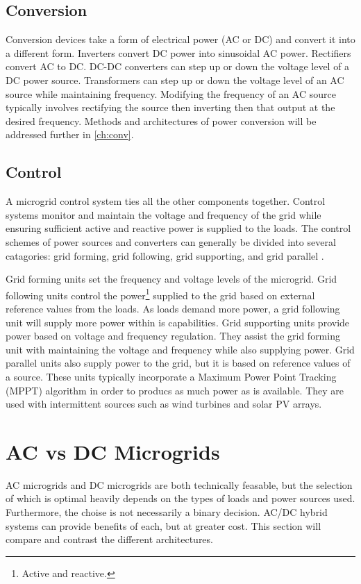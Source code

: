 \subsection{Conversion}
Conversion devices take a form of electrical power (AC or DC) and convert it into a different form. Inverters convert DC power into sinusoidal AC power. Rectifiers convert AC to DC. DC-DC converters can step up or down the voltage level of a DC power source. Transformers can step up or down the voltage level of an AC source while maintaining frequency. Modifying the frequency of an AC source typically involves rectifying the source then inverting then that output at the desired frequency. Methods and architectures of power conversion will be addressed further in \autoref{ch:conv}.

\subsection{Control}
A microgrid control system ties all the other components together. Control systems monitor and maintain the voltage and frequency of the grid while ensuring sufficient active and reactive power is supplied to the loads. The control schemes of power sources and converters can generally be divided into several catagories: grid forming, grid following, grid supporting, and grid parallel \cite{Ortjohann2012, Engler, Strauss2003}. 

Grid forming units set the frequency and voltage levels of the microgrid. Grid following units control the power\footnote{Active and reactive.} supplied to the grid based on external reference values from the loads. As loads demand more power, a grid following unit will supply more power within is capabilities. Grid supporting units provide power based on voltage and frequency regulation. They assist the grid forming unit with maintaining the voltage and frequency while also supplying power. Grid parallel units also supply power to the grid, but it is based on reference values of a source. These units typically incorporate a Maximum Power Point Tracking (MPPT) algorithm in order to producs as much power as is available. They are used with intermittent sources such as wind turbines and solar PV arrays. 


\section{AC vs DC Microgrids}
AC microgrids and DC microgrids are both technically feasable, but the selection of which is optimal heavily depends on the types of loads and power sources used. Furthermore, the choise is not necessarily a binary decision. AC/DC hybrid systems can provide benefits of each, but at greater cost. This section will compare and contrast the different architectures.

